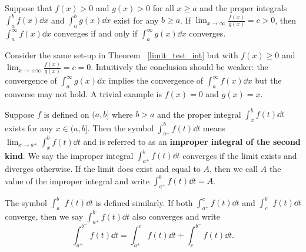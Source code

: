 \documentclass[a4paper]{ctexart}
\begin{document}
    \begin{mythm}\label{limit_test_int}
        Suppose that $f(x)>0$ and $g(x)>0$ for all $x\ge a$ and the proper integrals $\displaystyle \int_a^b f(x) \dd x$ and $\displaystyle \int_a^b g(x) \dd x$ exist for any $b\ge a$. If $\displaystyle \lim_{x\to \infty} \frac{f(x)}{g(x)} = c>0$, then $\displaystyle \int_a^\infty f(x) \dd x$ converges if and only if $\displaystyle \int_a^\infty g(x) \dd x$ converges.
    \end{mythm}
    \begin{myrmk}
        Consider the same set-up in Theorem ~\ref{limit_test_int} but with $f(x)\ge 0$ and $\displaystyle \lim_{x\to +\infty} \frac{f(x)}{g(x)} = c = 0$. Intuitively the conclusion should be weaker: the convergence of $\displaystyle \int_a^\infty g(x) \dd x$ implies the convergence of $\displaystyle \int_a^\infty f(x) \dd x$ but the converse may not hold. A trivial example is $f(x)=0$ and $g(x)=x$.
    \end{myrmk}
    \begin{mydef}
        Suppose $f$ is defined on $(a,b]$ where $b>a$ and the proper integral $\displaystyle \int_x^b f(t) \dd t$ exists for any $x\in (a,b]$. Then the symbol $\displaystyle \int_{a^+}^b f(t) \dd t$ means $\displaystyle \lim_{x\to a^+} \int_x^b f(t) \dd t$ and is referred to as an \textbf{improper integral of the second kind}. We say the improper integral $\displaystyle \int_{a^+}^b f(t) \dd t$ converges if the limit exists and diverges otherwise. If the limit does exist and equal to $A$, then we call $A$ the value of the improper integral and write $\displaystyle \int_{a^+}^b f(t) \dd t = A$.
    \end{mydef}
    \begin{mydef}
        The symbol $\displaystyle \int_{a}^{b^-} f(t) \dd t$ is defined similarly. If both $\displaystyle \int_{a^+}^c f(t) \dd t$ and $\displaystyle \int_c^{b^-} f(t) \dd t$ converge, then we say $\displaystyle \int_{a^+}^{b^-} f(t) \dd t$ also converges and write
        \[
        \int_{a^+}^{b^-} f(t) \dd t = \int_{a^+}^c f(t) \dd t + \int_c^{b^-} f(t) \dd t.
        \]
    \end{mydef}
    
\end{document}
